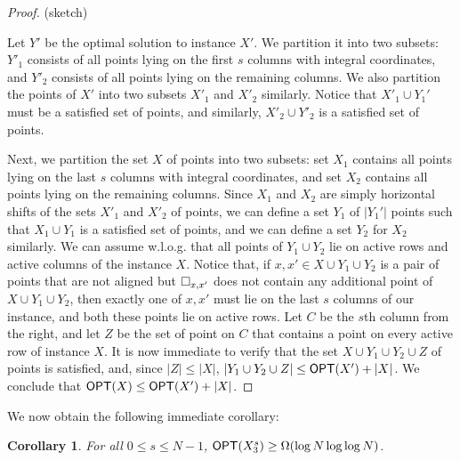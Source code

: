 \documentclass[11pt]{article}
\numberwithin{equation}{section}
\newtheorem{corollary}[theorem]{Corollary}
\theoremstyle{definition}
\theoremstyle{plain}
\begin{document}
\begin{proof}
	(sketch)
	
	Let $Y'$ be the optimal solution to instance $X'$. We partition it into two subsets: $Y'_1$ consists of all points lying on the first $s$ columns with integral coordinates, and $Y'_2$ consists of all points lying on the remaining columns. We also partition the points of $X'$ into two subsets $X'_1$ and $X'_2$ similarly.  Notice that $X'_1\cup Y_1'$ must be a satisfied set of points, and similarly, $X'_2\cup Y'_2$ is a satisfied set of points.
	
	Next, we partition the set $X$ of points into two subsets: set $X_1$ contains all points lying on the last $s$ columns with integral coordinates, and set $X_2$ contains all points lying on the remaining columns. Since $X_1$ and $X_2$ are simply horizontal shifts of the sets $X'_1$ and $X'_2$ of points, we can define a set $Y_1$ of $|Y_1'|$ points such that $X_1\cup Y_1$ is a satisfied set of points, and we can define a set $Y_2$ for $X_2$ similarly. We can assume w.l.o.g. that all points of $Y_1\cup Y_2$ lie on active rows and active columns of the instance $X$. Notice that, if $x,x'\in X\cup Y_1\cup Y_2$ is a pair of points that are not aligned but $\Box_{x,x'}$ does not contain any additional point of $X\cup Y_1\cup Y_2$, then exactly one of $x,x'$ must lie on the last $s$ columns of our instance, and both these points lie on active rows. Let $C$ be the $s$th column from the right, and let $Z$ be the set of point on $C$ that contains a point on every active row of instance $X$. It is now immediate to verify that the set $X\cup Y_1\cup Y_2\cup Z$ of points is satisfied, and, since $|Z|\leq |X|$, $|Y_1\cup Y_2\cup Z|\leq \mbox{\sf OPT}(X')+|X|$. We conclude that $\mbox{\sf OPT}(X)\leq \mbox{\sf OPT}(X')+|X|$.
\end{proof}
	
We now obtain the following immediate corollary:

\begin{corollary}\label{cor: large solution cost for shifted instance}
For all $0\leq s\leq N-1$, $\mbox{\sf OPT}(X_3^s)\geq \Omega(\log N\log\log N)$.
\end{corollary}
\end{document}

